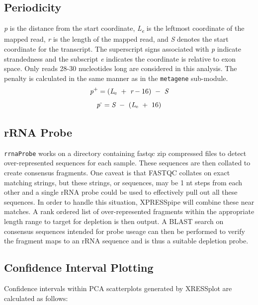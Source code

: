 \documentclass[11pt, a4paper, oneside]{article}
\begin{document}
\subsection{Periodicity}
\textit{p} is the distance from the start coordinate, \textit{L\textsubscript{e}} is the leftmost coordinate of the mapped read, \textit{r} is the length of the mapped read, and \textit{S} denotes the start coordinate for the transcript. The superscript signs associated with \textit{p} indicate strandedness and the subscript \textit{e} indicates the coordinate is relative to exon space. Only reads 28-30 nucleotides long are considered in this analysis. The penalty is calculated in the same manner as in the \texttt{metagene} sub-module.
\begin{equation}
  \textit{p}\textsuperscript{+} = (\textit{L}\textsubscript{e}\ +\ \textit{r} - 16)\ -\ \textit{S}
\end{equation}
\begin{equation}
  \textit{p}\textsuperscript{-} = \textit{S}\ -\ (\textit{L}\textsubscript{e}\ +\ 16)
\end{equation}

\subsection{rRNA Probe}
\texttt{rrnaProbe} works on a directory containing fastqc \cite{fastqc} zip compressed files to detect over-represented sequences for each sample. These sequences are then collated to create consensus fragments. One caveat is that FASTQC collates on exact matching strings, but these strings, or sequences, may be 1 nt steps from each other and a single rRNA probe could be used to effectively pull out all these sequences. In order to handle this situation, XPRESSpipe will combine these near matches. A rank ordered list of over-represented fragments within the appropriate length range to target for depletion is then output. A BLAST \cite{blast} search on consensus sequences intended for probe useage can then be performed to verify the fragment maps to an rRNA sequence and is thus a suitable depletion probe.

\subsection{Confidence Interval Plotting}
Confidence intervals within PCA scatterplots generated by XRESSplot are calculated as follows:
\end{document}
